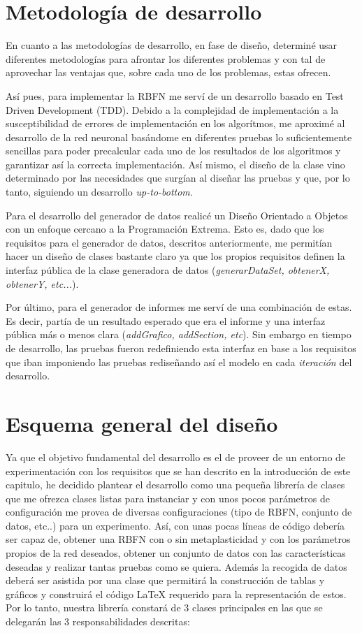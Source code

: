 \documentclass[10pt,a4paper]{report}
\begin{document}
\section{Metodología de desarrollo}
En cuanto a las metodologías de desarrollo, en fase de diseño, determiné usar diferentes metodologías para afrontar los diferentes problemas y con tal de aprovechar las ventajas que, sobre cada uno de los problemas, estas ofrecen.

Así pues, para implementar la RBFN me serví de un desarrollo basado en Test Driven Development (TDD). Debido a la complejidad de implementación a la susceptibilidad de errores de implementación en los algorítmos, me aproximé al desarrollo de la red neuronal basándome en diferentes pruebas lo suficientemente sencillas para poder precalcular cada uno de los resultados de los algoritmos y garantizar así la correcta implementación. Así mismo, el diseño de la clase vino determinado por las necesidades que surgían al diseñar las pruebas y que, por lo tanto, siguiendo un desarrollo \textit{up-to-bottom}.

Para el desarrollo del generador de datos realicé un Diseño Orientado a Objetos con un enfoque cercano a la Programación Extrema. Esto es, dado que los requisitos para el generador de datos, descritos anteriormente, me permitían hacer un diseño de clases bastante claro ya que los propios requisitos definen la interfaz pública de la clase generadora de datos (\textit{generarDataSet, obtenerX, obtenerY, etc...}).

Por último, para el generador de informes me serví de una combinación de estas. Es decir, partía de un resultado esperado que era el informe y una interfaz pública más o menos clara (\textit{addGrafico, addSection, etc}). Sin embargo en tiempo de desarrollo, las pruebas fueron redefiniendo esta interfaz en base a los requisitos que iban imponiendo las pruebas rediseñando así el modelo en cada \textit{iteración} del desarrollo.

\section{Esquema general del diseño}
Ya que el objetivo fundamental del desarrollo es el de proveer de un entorno de experimentación con los requisitos que se han descrito en la introducción de este capitulo, he decidido plantear el desarrollo como una pequeña librería de clases que me ofrezca clases listas para instanciar y con unos pocos parámetros de configuración me provea de diversas configuraciones (tipo de RBFN, conjunto de datos, etc..) para un experimento. Así, con unas pocas líneas de código debería ser capaz de, obtener una RBFN con o sin metaplasticidad y con los parámetros propios de la red deseados, obtener un conjunto de datos con las características deseadas y realizar tantas pruebas como se quiera. Además la recogida de datos deberá ser asistida por una clase que permitirá la construcción de tablas y gráficos y construirá el código LaTeX requerido para la representación de estos.
Por lo tanto, nuestra librería constará de 3 clases principales en las que se delegarán las 3 responsabilidades descritas:
\end{document}
